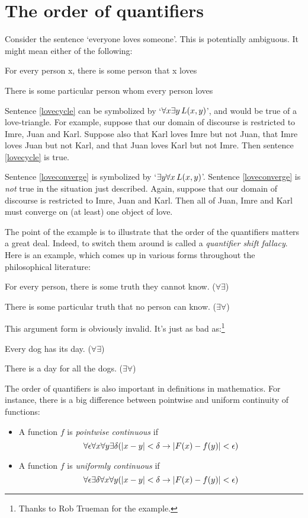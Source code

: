 \section{The order of quantifiers}\label{ss:OrderQuant}
Consider the sentence `everyone loves someone'. This is potentially ambiguous. It might mean either of the following:
	\begin{earg}
		\item[\ex{lovecycle}] For every person x, there is some person that x loves
		\item[\ex{loveconverge}] There is some particular person whom every person loves
	\end{earg}
Sentence \ref{lovecycle} can be symbolized by `$\forall x \exists y\, \mathord{L}(x,y)$', and would be true of a love-triangle. For example, suppose that our domain of discourse is restricted to Imre, Juan and Karl. Suppose also that Karl loves Imre but not Juan, that Imre loves Juan but not Karl, and that Juan loves Karl but not Imre. Then sentence \ref{lovecycle} is true. 

Sentence \ref{loveconverge} is symbolized by `$\exists y \forall x\, \mathord{L}(x,y)$'. Sentence \ref{loveconverge} is \emph{not} true in the situation just described. Again, suppose that our domain of discourse is restricted to Imre, Juan and Karl. Then all of Juan, Imre and Karl must converge on (at least) one object of love. 

The point of the example is to illustrate that the order of the quantifiers matters a great deal. Indeed, to switch them around is called a \emph{quantifier shift fallacy}. Here is an example, which comes up in various forms throughout the philosophical literature:
	\begin{earg}
		\item[] For every person, there is some truth they cannot know. \hfill ($\forall \exists$)
		\item[\therefore] There is some particular truth that no person can know. \hfill ($\exists \forall$)
	\end{earg}
This argument form is obviously invalid. It's just as bad as:\footnote{Thanks to Rob Trueman for the example.}
	\begin{earg}
		\item[] Every dog has its day. \hfill ($\forall \exists$)
		\item[\therefore] There is a day for all the dogs. \hfill ($\exists \forall$)
	\end{earg}

   
The order of quantifiers is also important in definitions in mathematics.  For instance, there is a big difference between pointwise and uniform continuity of functions:
\begin{itemize}
\item A function $f$ is \emph{pointwise continuous} if
\[
\forall \epsilon\forall x\forall y\exists \delta(\left|x - y\right| < \delta \to \left|\mathord{F}(x) - f(y)\right| < \epsilon)
\]
\item A function $f$ is \emph{uniformly continuous} if
\[
\forall \epsilon\exists \delta\forall x\forall y(\left|x - y\right| < \delta \to \left|\mathord{F}(x) - f(y)\right| < \epsilon)
\]
\end{itemize}

